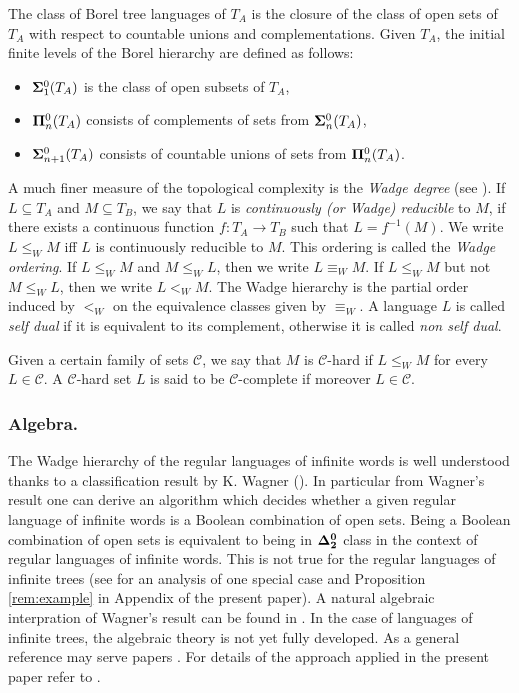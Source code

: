 The class of Borel tree languages of $T_A$ is the
closure of the class of open sets of $T_A$ with respect to countable unions and
complementations. Given $T_A$, the initial finite levels of the
Borel hierarchy are defined as follows: %
\begin{itemize}
\item ${\bf\Sigma}^0_1(T_A)$ is the class of open subsets of $T_A$, 
\item ${\bf\Pi}^0_n(T_A)$ consists of complements of sets from ${\bf\Sigma}^0_n(T_A)$, 
\item ${\bf\Sigma}^0_{n+1}(T_A)$ consists of countable unions of sets from ${\bf\Pi}^0_n(T_A)$. 
\end{itemize}

A much finer measure of the topological complexity is the \emph{Wadge degree} (see \cite[Chapter 21.E]{kechris}).
If $L \subseteq T_A$ and $M\subseteq T_B$, we say that $L$ is \emph{continuously (or Wadge)
reducible} to $M$, if there exists a continuous function $f: T_A \to T_B$ such that $L=
f^{-1}(M)$. We write $L \leq_W M$ iff $L$ is continuously reducible to $M$.
This ordering is called the {\em Wadge ordering}. If $L \leq_W M$ and $M \leq_W L$, then we write $L
\equiv_W M$. If $L \leq_W M$ but not $M \leq_W L$, then we write $L<_W
M$. The Wadge hierarchy is the partial order induced by $<_W$ on the
equivalence classes given by $\equiv_W$. A language  $L$ is called {\em self dual} if it is equivalent 
to its complement, otherwise it is called {\em non self dual}.

Given a certain family of sets $\mathcal{C}$, we say that $M$ is $\mathcal{C}$-hard if $L
\leq_W M$ for every $L \in \mathcal{C}$. A    $\mathcal{C}$-hard set $L$ is said to be $\mathcal{C}$-complete if 
moreover $L \in \mathcal{C}$.
\subsubsection*{Algebra.}
The Wadge hierarchy of the regular languages of infinite words is well understood thanks to a classification result by K. Wagner (\cite{wagner}). In particular from Wagner's result one can derive an algorithm which decides whether a given regular language of infinite words is a Boolean combination of open sets. Being a Boolean combination of open sets is equivalent to being in ${\bf \Delta^0_2}$ class in the context of regular languages of infinite words. This is not true for the regular languages of infinite trees (see \cite[Section 4.1]{bp} for an analysis of one special case and Proposition \ref{rem:example} in Appendix of the present paper).   A natural algebraic interpration of Wagner's result can be found in \cite[Theorem V.6.2]{pinperrin}. In the case of languages of infinite trees, the algebraic theory is not yet fully developed. As a general reference may serve papers \cite{blumensath,bp,bojtrees,bojidziaszek}. For details of the approach applied in the present paper refer to \cite[Section 3]{bp}. 

